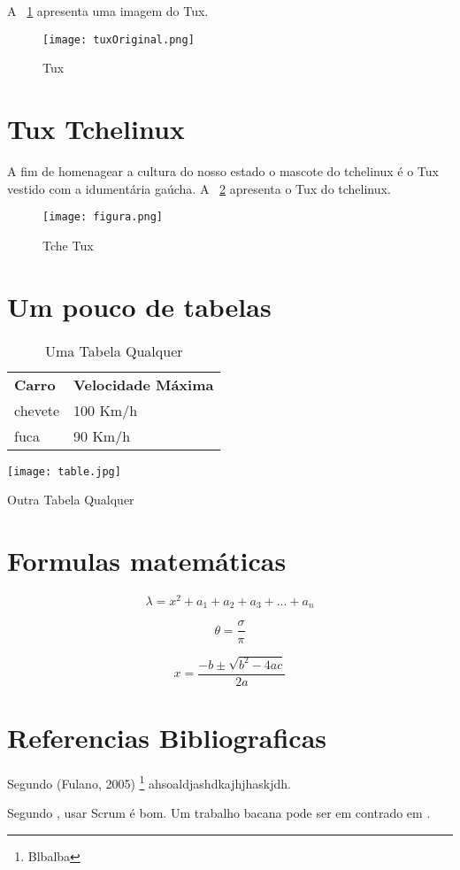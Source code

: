 \documentclass[conference]{IEEEtran}
\begin{document}
	A \figurename~\ref{tux} apresenta uma imagem do Tux.
	
	\begin{figure}[!hbt]
		\centering
		\texttt{[image: tuxOriginal.png]}
		\caption{Tux}
		\label{tux}
	\end{figure}
	
	
	\section{Tux Tchelinux}
	
		A fim de homenagear a cultura do nosso estado o mascote do tchelinux é o Tux vestido com a idumentária gaúcha. A \figurename~\ref{tcheTux} apresenta o Tux do tchelinux.
		
		\begin{figure}[!htb]
			\centering
			\texttt{[image: figura.png]}
			\caption{Tche Tux}
			\label{tcheTux}
		\end{figure}
		
	
	\section{Um pouco de tabelas}
	
	\begin{table}[]
		\centering
		\begin{tabular}{ll}
			\textbf{Carro}   & \textbf{Velocidade Máxima} \\
			chevete & 100 Km/h          \\
			fuca    & 90 Km/h           \\
		\end{tabular}
		\caption{Uma Tabela Qualquer}
		\label{tabela}
	\end{table}

	\begin{table}[]
		\centering
		\texttt{[image: table.jpg]}
		\caption{Outra Tabela Qualquer}
		\label{tabelaImagem}
	\end{table}

	
	\section{Formulas matemáticas}
	
	$$\lambda = {x^2 + a_1 + a_2 + a_3 + ... + a_n }$$
	
	
	
	$$
	\theta  = \frac{\sigma}{\pi}
	$$
	
	
	\begin{equation}
	x=\frac{-b\pm\sqrt{b^2-4ac}}{2a} 
	\label{bask}
	\end{equation}
	
	
	\section{Referencias Bibliograficas}
	
	Segundo (Fulano, 2005) \footnote{Blbalba} ahsoaldjashdkajhjhaskjdh.
	
	Segundo \cite{scrumGuide}, usar Scrum é bom. Um trabalho bacana pode ser em contrado em \cite{16SBG_suscity}.
	
	
	
	


	
	
	
	
	
\end{document}
